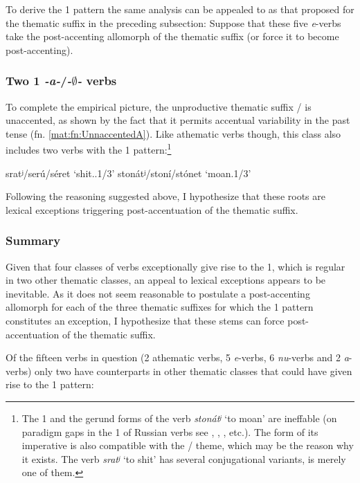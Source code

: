 \documentclass[output=paper,colorlinks,citecolor=black,koreanfont]{langscibook}
\begin{document}
To derive the {1\SG} pattern the same analysis can be appealed to as that proposed for the thematic suffix  in the preceding subsection: Suppose that these five \textit{e}-verbs take the post-accenting allomorph of the thematic suffix (or force it to become post-accenting).

\subsubsection{Two {1\SG} \textit{-a-}/\textit{-$\emptyset$-} verbs}

To complete the empirical picture, the unproductive thematic suffix / is unaccented, as shown by the fact that it permits accentual variability in the past tense (fn. \ref{mat:fn:UnnaccentedA}). Like athematic verbs though, this class also includes two verbs with the {1\SG} pattern:\footnote{The {1\SG} and the gerund forms of the verb \textit{stonátʲ} ‘to moan’ are ineffable (on paradigm gaps in the {1\SG} of Russian verbs see \citet{Sims2006}, \citet{DalandEtAl2007}, \citet{Pertsova2016}, etc.). The form of its imperative is also compatible with the / theme, which may be the reason why it exists. The verb \textit{sratʲ} ‘to shit’ has several conjugational variants,  is merely one of them.}

\ea\label{mat:ex:sratstonat}
\ea\label{mat:ex:srat} {sratʲ}/{serú}/{séret} ‘shit.{\INF}.{1\SG}/{3\SG}’ 
\ex\label{mat:ex:stonat} {stonátʲ}/{stoní}/{stónet} ‘moan.{\INF}{1\SG}/{3\SG}’
\z
\z

\noindent Following the reasoning suggested above, I hypothesize that these roots are lexical exceptions triggering post-accentuation of the thematic suffix.

\subsubsection{Summary}

Given that four classes of verbs exceptionally give rise to the {1\SG}, which is regular in two other thematic classes, an appeal to lexical exceptions appears to be inevitable. As it does not seem reasonable to postulate a post-accenting allomorph for each of the three thematic suffixes for which the {1\SG} pattern constitutes an exception, I hypothesize that these stems can force post-accentuation of the thematic suffix.

Of the fifteen verbs in question (2 athematic verbs, 5 \textit{e}-verbs, 6 \textit{nu}-verbs and 2 \textit{a}-verbs) only two have counterparts in other thematic classes that could have given rise to the {1\SG} pattern:
\end{document}
